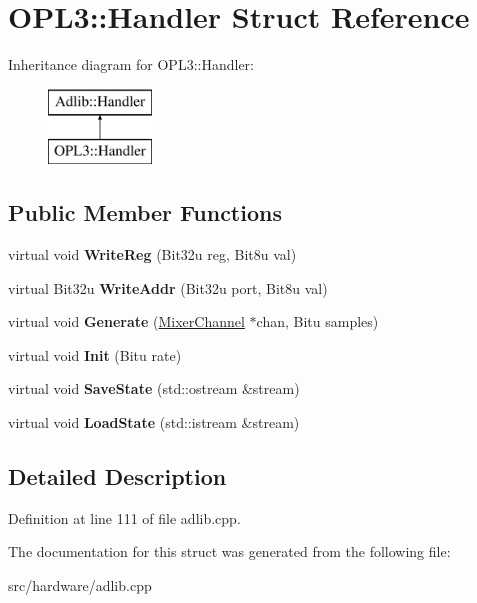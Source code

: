 \hypertarget{structOPL3_1_1Handler}{\section{O\-P\-L3\-:\-:Handler Struct Reference}
\label{structOPL3_1_1Handler}
}
Inheritance diagram for O\-P\-L3\-:\-:Handler\-:\begin{figure}[H]
\begin{center}
\leavevmode
\includegraphics[height=2.000000cm]{structOPL3_1_1Handler}
\end{center}
\end{figure}
\subsection*{Public Member Functions}
\begin{DoxyCompactItemize}
\item 
\hypertarget{structOPL3_1_1Handler_abd58ad3a3a13fcc8ef3e19bf1fd76bd1}{virtual void {\bfseries Write\-Reg} (Bit32u reg, Bit8u val)}\label{structOPL3_1_1Handler_abd58ad3a3a13fcc8ef3e19bf1fd76bd1}

\item 
\hypertarget{structOPL3_1_1Handler_aeb1af51c1839cc20712d4434077a7dcb}{virtual Bit32u {\bfseries Write\-Addr} (Bit32u port, Bit8u val)}\label{structOPL3_1_1Handler_aeb1af51c1839cc20712d4434077a7dcb}

\item 
\hypertarget{structOPL3_1_1Handler_ae5db8d97daf264ca7c1d4efd9a967323}{virtual void {\bfseries Generate} (\hyperlink{classMixerChannel}{Mixer\-Channel} $\ast$chan, Bitu samples)}\label{structOPL3_1_1Handler_ae5db8d97daf264ca7c1d4efd9a967323}

\item 
\hypertarget{structOPL3_1_1Handler_ac1b6b29e04d2c9bd45abad402a44e380}{virtual void {\bfseries Init} (Bitu rate)}\label{structOPL3_1_1Handler_ac1b6b29e04d2c9bd45abad402a44e380}

\item 
\hypertarget{structOPL3_1_1Handler_a549161214cb61687a7dde421854f4ab7}{virtual void {\bfseries Save\-State} (std\-::ostream \&stream)}\label{structOPL3_1_1Handler_a549161214cb61687a7dde421854f4ab7}

\item 
\hypertarget{structOPL3_1_1Handler_ab5c2123d2e005b15734ec9641d74ce62}{virtual void {\bfseries Load\-State} (std\-::istream \&stream)}\label{structOPL3_1_1Handler_ab5c2123d2e005b15734ec9641d74ce62}

\end{DoxyCompactItemize}


\subsection{Detailed Description}


Definition at line 111 of file adlib.\-cpp.



The documentation for this struct was generated from the following file\-:\begin{DoxyCompactItemize}
\item 
src/hardware/adlib.\-cpp\end{DoxyCompactItemize}
